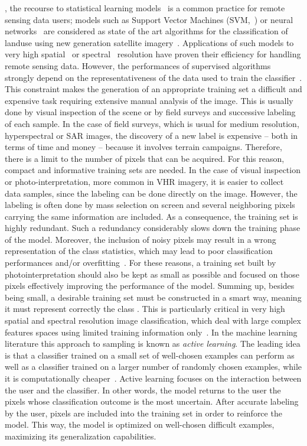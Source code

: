 

, the recourse to statistical learning models~ is  a common practice for remote sensing data users; models such as Support Vector Machines (SVM,~) or neural networks~ are considered as state of the art algorithms for the classification of landuse using  new generation satellite imagery~. Applications of such models to very high spatial~ or spectral~ resolution have proven their efficiency for handling remote sensing data.
However, the performances of supervised algorithms strongly depend on the representativeness of the data used to train the classifier~. This constraint makes the generation of an appropriate training set a difficult and expensive task requiring extensive manual analysis of the image. This is usually done by visual inspection of the scene or by field surveys and successive labeling of each sample.
In the case of field surveys, which is usual for medium resolution, hyperspectral or SAR images, the discovery of a new label is expensive -- both in terms of time and money -- because it involves terrain campaigns. Therefore, there is a limit to the number of pixels that can be acquired. For this reason, compact and informative training sets are needed. 
In the case of visual inspection or photo-interpretation, more common in VHR imagery, it is easier to collect data samples, since the labeling can be done directly on the image. However, the labeling is often done by mass selection on screen and several neighboring pixels carrying the same information are included. As a consequence, the training set is highly redundant. Such a redundancy considerably slows down the training phase of the model.  Moreover,  the inclusion of noisy pixels may result in a wrong representation of the class statistics, which may lead to poor classification performances and/or overfitting~. For these reasons, a training set built by photointerpretation should also be kept as small as possible and focused on those pixels effectively improving the performance of the model.
Summing up, besides being small, a desirable training set must be constructed in a smart way, meaning it must represent correctly the class . This is particularly critical in very high spatial and spectral resolution image classification, which deal with large  complex features spaces using limited training information only~. 
In the machine learning literature this approach to sampling is known as \emph{active learning}. The leading idea is that a classifier trained on a small set of well-chosen examples can perform  as well as a classifier trained on a larger number of randomly chosen examples, while it is computationally cheaper~. Active learning focuses on the interaction between the user and the classifier. In other words, the model returns to the user the  pixels whose classification outcome is the most uncertain. After accurate labeling by the user, pixels are included into the training set in order to reinforce the model. This way, the model is optimized on well-chosen difficult examples, maximizing its generalization capabilities.
